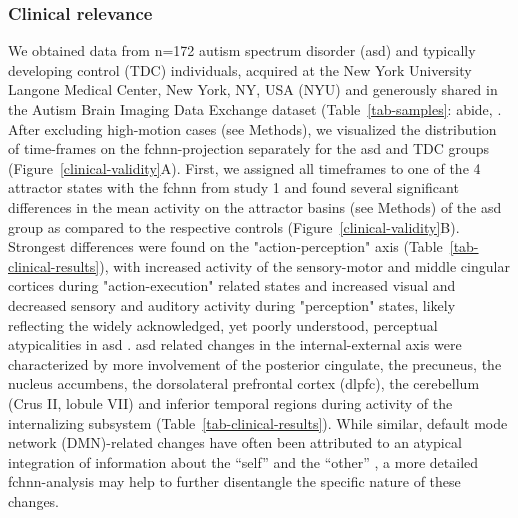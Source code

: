 \documentclass{article}
\begin{document}
\subsubsection{Clinical relevance}

We obtained data from n=172 autism spectrum disorder (\acrshort{asd}) and typically developing control (TDC) individuals, acquired at the New York University Langone Medical Center, New York, NY, USA (NYU) and generously shared in the Autism Brain Imaging Data Exchange dataset (Table~\ref{tab-samples}: \acrshort{abide}, \citep{di2014autism}.
After excluding high-motion cases (see Methods), we visualized the distribution of time-frames on the \acrshort{fchnn}-projection separately for the \acrshort{asd} and TDC groups (Figure~\ref{clinical-validity}A).
First, we assigned all timeframes to one of the 4 attractor states with the \acrshort{fchnn} from study 1 and found several significant differences in the mean activity on the attractor basins (see Methods) of the \acrshort{asd} group as compared to the respective controls (Figure~\ref{clinical-validity}B).
Strongest differences were found on the "action-perception" axis (Table~\ref{tab-clinical-results}), with increased activity of the sensory-motor and mid\acrshort{dl}e cingular cortices during "action-execution" related states and increased visual and decreased sensory and auditory activity during "perception" states, likely reflecting the widely acknowledged, yet poorly understood, perceptual atypicalities in \acrshort{asd} \citep{hadad2019perception}. \acrshort{asd} related changes in the internal-external axis were characterized by more involvement of the posterior cingulate, the precuneus, the nucleus accumbens, the dorsolateral prefrontal cortex (\acrshort{dl}\acrshort{pfc}), the cerebellum (Crus II, lobule VII) and inferior temporal regions during activity of the internalizing subsystem (Table~\ref{tab-clinical-results}). While similar, default mode network (DMN)-related changes have often been attributed to an atypical integration of information about the ``self'' and the ``other'' \citep{padmanabhan2017default}, a more detailed \acrshort{fchnn}-analysis may help to further disentangle the specific nature of these changes.
\end{document}
